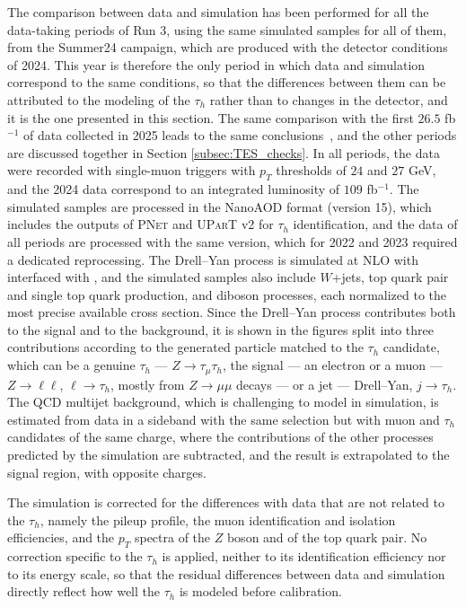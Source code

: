 The comparison between data and simulation has been performed for all the data-taking periods of Run 3, using the same simulated samples for all of them, from the Summer24 campaign, which are produced with the detector conditions of 2024. This year is therefore the only period in which data and simulation correspond to the same conditions, so that the differences between them can be attributed to the modeling of the $\tau_h$ rather than to changes in the detector, and it is the one presented in this section. The same comparison with the first $26.5$ fb$^{-1}$ of data collected in 2025 leads to the same conclusions~\cite{CMS-DP-2025-074}, and the other periods are discussed together in Section \ref{subsec:TES_checks}. In all periods, the data were recorded with single-muon triggers with $p_T$ thresholds of $24$ and $27$ GeV, and the 2024 data correspond to an integrated luminosity of $109$ fb$^{-1}$. The simulated samples are processed in the NanoAOD format (version 15), which includes the outputs of \textsc{PNet} and \textsc{UParT} v2 for $\tau_h$ identification, and the data of all periods are processed with the same version, which for 2022 and 2023 required a dedicated reprocessing. The Drell--Yan process is simulated at NLO with \POWHEG{} interfaced with \PYTHIA{}, and the simulated samples also include $W$+jets, top quark pair and single top quark production, and diboson processes, each normalized to the most precise available cross section. Since the Drell--Yan process contributes both to the signal and to the background, it is shown in the figures split into three contributions according to the generated particle matched to the $\tau_h$ candidate, which can be a genuine $\tau_h$ — $Z\to\tau_\mu\tau_h$, the signal — an electron or a muon — $Z\to\ell\ell$, $\ell\to\tau_h$, mostly from $Z\to\mu\mu$ decays — or a jet — Drell--Yan, $j\to\tau_h$. The QCD multijet background, which is challenging to model in simulation, is estimated from data in a sideband with the same selection but with muon and $\tau_h$ candidates of the same charge, where the contributions of the other processes predicted by the simulation are subtracted, and the result is extrapolated to the signal region, with opposite charges.

The simulation is corrected for the differences with data that are not related to the $\tau_h$, namely the pileup profile, the muon identification and isolation efficiencies, and the $p_T$ spectra of the $Z$ boson and of the top quark pair. No correction specific to the $\tau_h$ is applied, neither to its identification efficiency nor to its energy scale, so that the residual differences between data and simulation directly reflect how well the $\tau_h$ is modeled before calibration.


